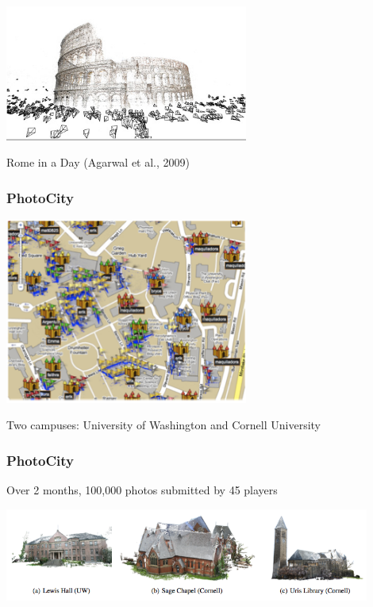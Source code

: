 \documentclass[aspectratio=169]{beamer}
\begin{document}
\begin{frame}

\begin{center}
\includegraphics[width=0.6\textwidth]{figures/rome_in_a_day}
\end{center}
Rome in a Day (Agarwal et al., 2009)

\end{frame}
\begin{frame}
\frametitle{PhotoCity}

\begin{center}
\includegraphics[width=0.6\textwidth]{figures/tuite_photocity_2011_fig2}
\end{center}

Two campuses: University of Washington and Cornell University

\end{frame}
\begin{frame}
\frametitle{PhotoCity}

Over 2 months, 100,000 photos submitted by 45 players
\vfill
\begin{center}
\includegraphics[width=0.9\textwidth]{figures/tuite_photocity_2011_fig8}
\end{center}

\end{frame}
\end{document}
